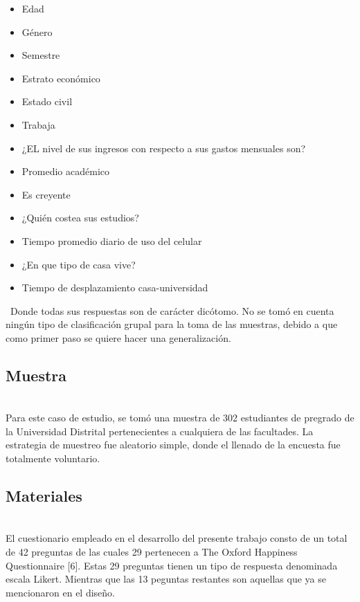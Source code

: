\documentclass[conference]{IEEEtran}
\begin{document}
   
   \begin{itemize}
    \item Edad\item Género \item Semestre \item Estrato económico \item Estado civil \item Trabaja\item ¿EL nivel de sus ingresos con respecto a sus gastos mensuales son?	 \item Promedio académico \item Es creyente \item ¿Quién costea sus estudios? \item Tiempo promedio
    diario de uso del celular \item ¿En que tipo de casa vive? \item Tiempo de desplazamiento casa-universidad\\
\end{itemize}\
      Donde todas sus respuestas son de carácter dicótomo. No se tomó en cuenta ningún tipo de clasificación grupal para la toma de las muestras, debido a que como primer paso se quiere hacer una generalización.
   
\subsection{Muestra}\\	

   Para este caso de estudio, se tomó una muestra de 302 estudiantes de pregrado de la Universidad Distrital pertenecientes a cualquiera de las facultades. La estrategia de muestreo fue aleatorio simple, donde el llenado de la encuesta fue totalmente voluntario.\\

\subsection{Materiales}\\

   El cuestionario empleado en el desarrollo del presente trabajo consto de un total de 42 preguntas de las cuales 29 pertenecen a The Oxford Happiness Questionnaire [6]. Estas 29 preguntas tienen un tipo de respuesta denominada escala Likert. Mientras que las 13 peguntas restantes son aquellas que ya se mencionaron en el diseño.\\
\end{document}
